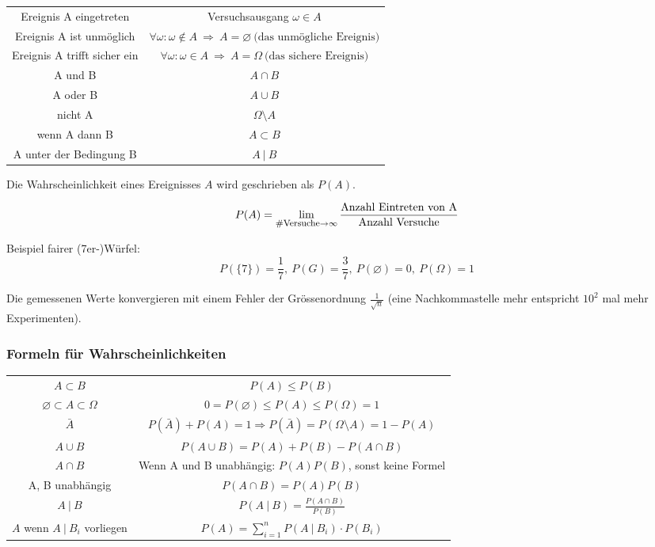 \documentclass[10pt,a4paper]{scrartcl}
\begin{document}
\begin{center}
\begin{tabular}{cc}
Ereignis A eingetreten & Versuchsausgang $\omega \in A$ \\ 
Ereignis A ist unmöglich & $\forall \omega: \omega \notin A \ \Rightarrow \ A = \varnothing \ \mbox{(das unmögliche Ereignis)}$  \\ 
Ereignis A trifft sicher ein & $\forall \omega: \omega \in A \ \Rightarrow \ A = \Omega \ \mbox{(das sichere Ereignis)}$ \\ 
A und B & $A \cap B$ \\ 
A oder B & $A \cup B$ \\ 
nicht A & $\Omega \setminus A$ \\ 
wenn A dann B & $A \subset B$  \\ 
A unter der Bedingung B & $A\ |\ B$ \\
\end{tabular}
\end{center}

Die Wahrscheinlichkeit eines Ereignisses $A$ wird geschrieben als $P(A)$.

$$P(A) = \lim_{\mbox{\footnotesize\#Versuche} \rightarrow \infty} \frac{\mbox{Anzahl Eintreten von A}}{\mbox{Anzahl Versuche}}$$

Beispiel fairer (7er-)Würfel: $$P(\{7\}) = \frac{1}{7},\ P(G) = \frac{3}{7}, \ P(\varnothing) = 0, \ P(\Omega) = 1$$

Die gemessenen Werte konvergieren mit einem Fehler der Grössenordnung $\frac{1}{\sqrt{n}}$ (eine Nachkommastelle mehr entspricht $10^2$ mal mehr Experimenten).

\subsubsection{Formeln für Wahrscheinlichkeiten} 

\begin{center}
\begin{tabular}{cc}
$A \subset B$ & $P(A) \leq P(B)$ \\
$\varnothing \subset A \subset \Omega$ & $0 = P(\varnothing) \leq P(A) \leq P(\Omega) = 1$ \\
$\bar{A}$ & $P(\bar{A}) + P(A) = 1 \Rightarrow P(\bar{A}) = P(\Omega \setminus A) = 1 - P(A)$ \\
$A \cup B$ & $ P(A\cup B) = P(A) + P(B) - P(A\cap B)$ \\
$A \cap B$ & Wenn A und B unabhängig: $P(A)P(B)$, sonst keine Formel \\
A, B unabhängig & $P(A\cap B) = P(A)P(B)$\\[2pt]
$A\ |\ B$ & $P(A\ |\ B) = \frac{P(A\cap B)}{P(B)}$ \\[2pt]
$A$ wenn $A\ |\ B_i$ vorliegen & $ P(A) = \sum_{i=1}^n P(A\ |\ B_i) \cdot P(B_i) $
\end{tabular}
\end{center}
\end{document}
